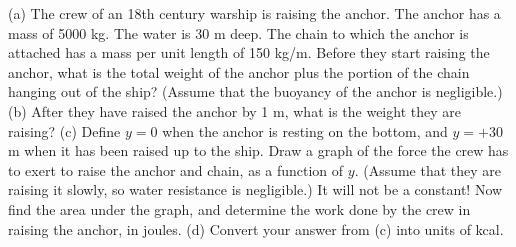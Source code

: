 (a) The crew of an 18th century warship is raising the
anchor. The anchor has a mass of 5000 kg. The water is 30
m deep. The chain to which the anchor is attached has a
mass per unit length of 150 kg/m. Before they start raising
the anchor, what is the total weight of the anchor plus the
portion of the chain hanging out of the ship? (Assume that
the buoyancy of the anchor is negligible.)\hwendpart
(b) After they have raised the anchor by 1 m, what is the
weight they are raising?\hwendpart
(c) Define $y=0$ when the anchor is resting on the bottom,
and $y=+30$ m when it has been raised up to the ship. Draw a
graph of the force the crew has to exert to raise the anchor
and chain, as a function of $y$. (Assume that they are
raising it slowly, so water resistance is negligible.) It
will not be a constant! Now find the area under the graph,
and determine the work done by the crew in raising
the anchor, in joules.\hwendpart
(d) Convert your answer from (c) into units of kcal. \answercheck

